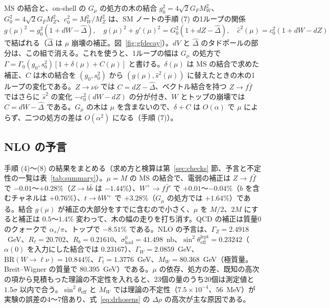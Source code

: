 \documentclass[a4paper,10pt]{ltjsarticle}
\newcommand{\MSbar}{\overline{\mathrm{MS}}}
\begin{document}
$\MSbar$ の結合と、on-shell の $G_\mu$ の処方の木の結合 $g_0^2=4\sqrt2G_FM_W^2$、$G_0^2=4\sqrt2G_FM_Z^2$、$c_0^2=M_W^2/M_Z^2$ は、SM ノートの手順 (7) の1ループの関係
\begin{equation}
g(\mu)^2=g_0^2(1+dW-\hat\Delta),\quad g(\mu)^2+g'(\mu)^2=G_0^2(1+dZ-\hat\Delta),\quad \hat c^2(\mu)=c_0^2(1+dW-dZ)
\label{eq:convOS}
\end{equation}
で結ばれる（$\hat\Delta$ は $\mu$ 崩壊の補正。図~\ref{fig:gfdecay}）。$dV$ と $\hat\Delta$ のタドポールの部分は、この組で消える。これを使うと、1ループの幅は $G_\mu$ の処方で $\Gamma=\Gamma_0(g_0,s_0^2)[1+\delta(\mu)+C(\mu)]$ と書ける。$\delta(\mu)$ は $\MSbar$ の結合で求めた補正、$C$ は木の結合を $(g_0,s_0^2)$ から $(g(\mu),\hat s^2(\mu))$ に替えたときの木の1ループの変化である。$Z\to\nu\bar\nu$ では $C=dZ-\hat\Delta$、ベクトル結合を持つ $Z\to f\bar f$ ではさらに $\hat s^2$ の変化 $-c_0^2(dW-dZ)$ の分が付き、$W$ とトップの崩壊では $C=dW-\hat\Delta$ である。$G_\mu$ の木は $\mu$ を含まないので、$\delta+C$ は $O(\alpha)$ で $\mu$ によらず、二つの処方の差は $O(\alpha^2)$ になる（手順 (7)）。

\subsection{NLO の予言}\label{sec:nlo}

手順 (4)〜(8) の結果をまとめる（求め方と検算は第~\ref{sec:checks} 節、予言と不定性の一覧は表~\ref{tab:summary}）。$\mu=M$ の $\MSbar$ の結合で、電弱の補正は $Z\to f\bar f$ で $-0.01$〜$+0.28\%$（$Z\to b\bar b$ は $-1.44\%$）、$W^+\to f\bar f'$ で $+0.01$〜$-0.04\%$（$b$ を含むチャネルは $+0.76\%$）、$t\to bW^+$ で $+3.28\%$（$G_\mu$ の処方では $+1.64\%$）である。結合 $g(\mu)$ が補正の大部分をすでに含むので小さく、$\mu$ を $M/2$、$2M$ にすると補正は $0.5$〜$1.4\%$ 変わって、木の幅の走りを打ち消す。QCD の補正は質量0のクォークで $\alpha_s/\pi$、トップで $-8.51\%$ である。NLO の予言は、$\Gamma_Z=2.4918$~GeV、$R_\ell=20.702$、$R_b=0.21610$、$\sigma^0_{\mathrm{had}}=41.498$~nb、$\sin^2\theta^{\mathrm{lept}}_{\mathrm{eff}}=0.23242$（$\alpha(0)$ を入力にした結合では $0.23167$）、$\Gamma_W=2.0859$~GeV、$\mathrm{BR}(W\to\ell\nu)=10.844\%$、$\Gamma_t=1.3776$~GeV、$M_W=80.368$~GeV（極質量。Breit--Wigner の質量で $80.395$~GeV）である。$\mu$ の依存、処方の差、既知の高次の項から見積もった理論の不定性を入れると、23個の量のうち20個は測定値と $1.5\sigma$ 以内で合う。$\sin^2\theta_{\mathrm{eff}}$ と $M_W$ では理論の不定性（$7.5\times10^{-4}$、$56$~MeV）が実験の誤差の4〜7倍あり、式~\eqref{eq:drhosens} の $\Delta\rho$ の高次が主な原因である。
\end{document}
